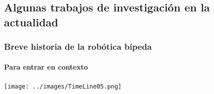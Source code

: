 {  \subsection[Investigaci\'on actual]{Algunas trabajos de investigaci\'on en la actualidad }
  \label{sec:algtra}
  \begin{frame}
    \frametitle{Breve historia de la rob\'otica b\'ipeda}
    \framesubtitle{Para entrar en contexto}
    \texttt{[image: ../images/TimeLine05.png]}
  \end{frame}
}
